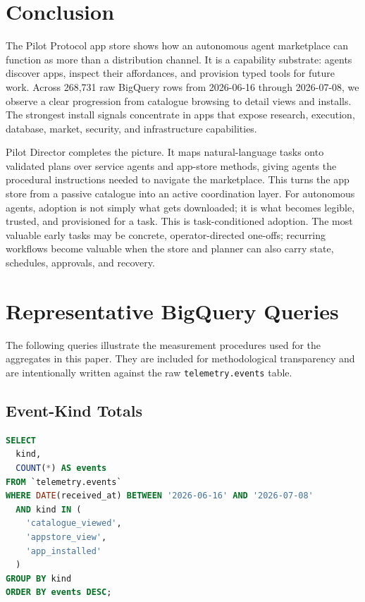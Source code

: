 \documentclass[10pt,twocolumn]{article}
\newcommand{\pilot}{Pilot Protocol}
\newcommand{\director}{Pilot Director}
\begin{document}
\section{Conclusion}
\label{sec:conclusion}

The \pilot{} app store shows how an autonomous agent marketplace can function as more than a distribution channel. It is a capability substrate: agents discover apps, inspect their affordances, and provision typed tools for future work. Across 268,731 raw BigQuery rows from 2026-06-16 through 2026-07-08, we observe a clear progression from catalogue browsing to detail views and installs. The strongest install signals concentrate in apps that expose research, execution, database, market, security, and infrastructure capabilities.

\director{} completes the picture. It maps natural-language tasks onto validated plans over service agents and app-store methods, giving agents the procedural instructions needed to navigate the marketplace. This turns the app store from a passive catalogue into an active coordination layer. For autonomous agents, adoption is not simply what gets downloaded; it is what becomes legible, trusted, and provisioned for a task. This is task-conditioned adoption. The most valuable early tasks may be concrete, operator-directed one-offs; recurring workflows become valuable when the store and planner can also carry state, schedules, approvals, and recovery.

\FloatBarrier
\balance
\appendix

\section{Representative BigQuery Queries}
\label{app:sql}

The following queries illustrate the measurement procedures used for the aggregates in this paper. They are included for methodological transparency and are intentionally written against the raw \texttt{telemetry.events} table.

\subsection{Event-Kind Totals}

\begin{lstlisting}[language=SQL]
SELECT
  kind,
  COUNT(*) AS events
FROM `telemetry.events`
WHERE DATE(received_at) BETWEEN '2026-06-16' AND '2026-07-08'
  AND kind IN (
    'catalogue_viewed',
    'appstore_view',
    'app_installed'
  )
GROUP BY kind
ORDER BY events DESC;
\end{lstlisting}
\end{document}
